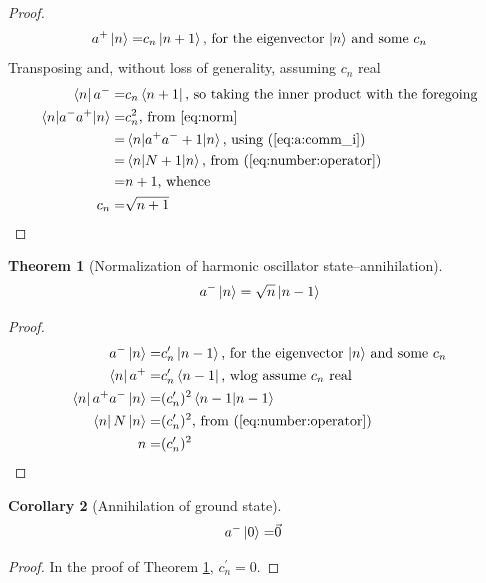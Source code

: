 \documentclass[]{article}
\newtheorem{thm}{Theorem}
\newtheorem{cor}[thm]{Corollary}
\begin{document}
\begin{proof}
	\begin{align*}
		a^+\ket{n}=&c_n\ket{n+1} \text{, for the eigenvector $\ket{n}$ and some $c_n$}\\
	\end{align*}
	Transposing and, without loss of generality, assuming  $c_n$ real
	\begin{align*}
		\bra{n}a^-=&c_n\bra{n+1} \text{, so taking the inner product with the foregoing}\\
		\braket{n|a^-a^+|n}=&c_n^2\text{, from \eqref{eq:norm}}\\
		=& \braket{n|a^+a^-+1|n}\text{, using (\ref{eq:a:comm_i})}\\
		=& \braket{n|N+1|n} \text{, from (\ref{eq:number:operator})}\\
		=&n+1 \text{, whence}\\
		c_n=&\sqrt{n+1}
	\end{align*}
\end{proof}

\begin{thm}[Normalization of harmonic oscillator state--annihilation]\label{thm:norm:a-}
	\begin{align*}
		a^-\ket{n}=\sqrt{n}\ket{n-1}
	\end{align*}
\end{thm}

\begin{proof}
	\begin{align*}
		a^-\ket{n}=&c^\prime_n\ket{n-1} \text{, for the eigenvector $\ket{n}$ and some $c_n$}\\
		\bra{n}a^+=&c^\prime_n\bra{n-1} \text{, wlog assume $c_n$ real}\\
		\bra{n}a^+a^-\ket{n}=&(c^\prime_n)^2\braket{n-1|n-1}\\
		\bra{n}N\ket{n}=&(c^\prime_n)^2 \text{, from (\ref{eq:number:operator})}\\
		n=&(c^\prime_n)^2
	\end{align*}
\end{proof}

\begin{cor}[Annihilation of ground state]
	\begin{align*}
		a^-\ket{0} =& \vec{0}
	\end{align*}
\end{cor}

\begin{proof}
	In the proof of Theorem \ref{thm:norm:a-}, $c^\prime_n=0$.
\end{proof}
\end{document}
